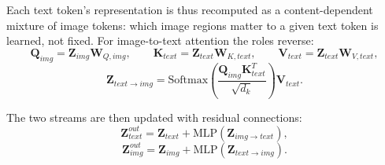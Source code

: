 \documentclass[10pt,twoside]{article}
\begin{document}
Each text token's representation is thus recomputed as a content-dependent mixture of image tokens: which image regions matter to a given text token is learned, not fixed. For image-to-text attention the roles reverse:
\begin{equation}\label{eq:qkv-i2t}
\mathbf{Q}_{img} = \mathbf{Z}_{img} \mathbf{W}_{Q,img}, \qquad \mathbf{K}_{text} = \mathbf{Z}_{text} \mathbf{W}_{K,text}, \qquad \mathbf{V}_{text} = \mathbf{Z}_{text} \mathbf{W}_{V,text},
\end{equation}
\begin{equation}\label{eq:i2t}
\mathbf{Z}_{text \rightarrow img} = \text{Softmax}\!\left( \frac{\mathbf{Q}_{img} \mathbf{K}_{text}^{T}}{\sqrt{d_k}} \right) \mathbf{V}_{text}.
\end{equation}

The two streams are then updated with residual connections:
\begin{equation}\label{eq:ztextout}
\mathbf{Z}_{text}^{out} = \mathbf{Z}_{text} + \text{MLP}\!\left( \mathbf{Z}_{img \rightarrow text} \right),
\end{equation}
\begin{equation}\label{eq:zimgout}
\mathbf{Z}_{img}^{out} = \mathbf{Z}_{img} + \text{MLP}\!\left( \mathbf{Z}_{text \rightarrow img} \right).
\end{equation}
\end{document}
